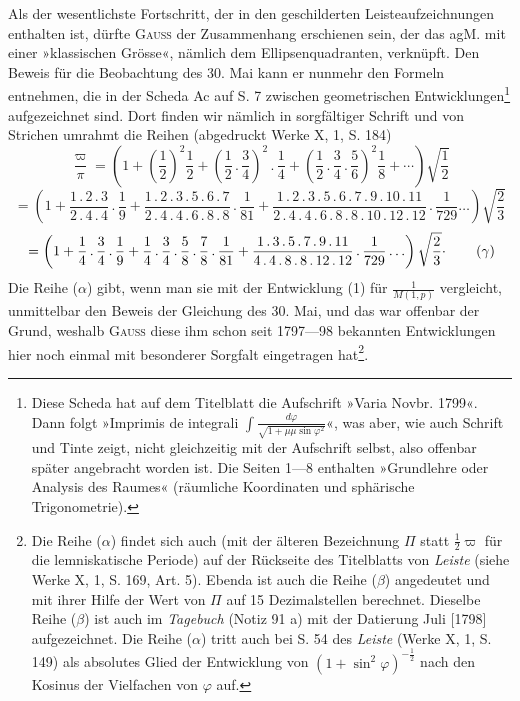 Als der wesentlichste Fortschritt, der in den geschilderten Leisteaufzeichnungen
enthalten ist, dürfte \textsc{Gauss} der Zusammenhang erschienen sein, der
das agM. mit einer »klassischen Grösse«, nämlich dem Ellipsenquadranten, verknüpft.
Den Beweis für die Beobachtung des 30. Mai kann er nunmehr
den Formeln entnehmen, die in der Scheda Ac auf S. 7 zwischen geometrischen
Entwicklungen\footnote{Diese Scheda hat auf dem Titelblatt die Aufschrift »Varia Novbr. 1799«. Dann folgt »Imprimis de integrali \(\displaystyle\int\frac{d\varphi}{\sqrt{1+\mu\mu\sin\varphi^2}}\)«, was aber, wie auch Schrift und Tinte zeigt, nicht gleichzeitig mit der Aufschrift selbst, also offenbar später angebracht worden ist. Die Seiten 1—8 enthalten »Grundlehre oder Analysis des Raumes« (räumliche Koordinaten und sphärische Trigonometrie).} aufgezeichnet sind. Dort finden wir nämlich in
sorgfältiger Schrift und von Strichen umrahmt die Reihen (abgedruckt Werke
X, 1, S. 184)
\begingroup\small\makeatletter\tagsleft@true\let\veqno\leqno\makeatother
\begin{equation*}
\frac\varpi\pi=\left(1+\left(\frac12\right)^2\frac12+\left(\frac12\,.\,\frac34\right)^2\,.\,\frac14+\left(\frac12\,.\,\frac34\,.\,\frac56\right)^2\frac18+\cdots\right)\sqrt{\frac12}\tag*{(\(\alpha\))}
\end{equation*}
\begin{equation*}
{}=\left(1+\frac{1\,.\,2\,.\,3}{2\,.\,4\,.\,4}\,.\,\frac19+\frac{1\,.\,2\,.\,3\,.\,5\,.\,6\,.\,7}{2\,.\,4\,.\,4\,.\,6\,.\,8\,.\,8}\,.\,\frac1{81}+\frac{1\,.\,2\,.\,3\,.\,5\,.\,6\,.\,7\,.\,9\,.\,10\,.\,11}{2\,.\,4\,.\,4\,.\,6\,.\,8\,.\,8\,.\,10\,.\,12\,.\,12}\,.\,\frac1{729}\ldots\right)\sqrt{\frac23}\tag*{(\(\beta\))}
\end{equation*}
\begin{equation*}
{}=\left(1+\frac14\,.\,\frac34\,.\,\frac19+\frac14\,.\,\frac34\,.\,\frac58\,.\,\frac78\,.\,\frac1{81}+\frac{1\,.\,3\,.\,5\,.\,7\,.\,9\,.\,11}{4\,.\,4\,.\,8\,.\,8\,.\,12\,.\,12}\,.\,\frac1{729}\ldots\right)\sqrt{\frac23}\mathpunct{\vcenter{\hbox{.}}}\tag*{(\(\gamma\))}
\end{equation*}
\endgroup
\noindent Die Reihe (\(\alpha\)) gibt, wenn man sie mit der Entwicklung (1) für \(\frac1{M(1,p)}\) vergleicht,
unmittelbar den Beweis der Gleichung des 30. Mai, und das war
offenbar der Grund, weshalb \textsc{Gauss} diese ihm schon seit 1797—98 bekannten
Entwicklungen hier noch einmal mit besonderer Sorgfalt eingetragen hat\footnote{Die Reihe (\(\alpha\)) findet sich auch (mit der älteren Bezeichnung \(\Pi\) statt \(\frac12\varpi\) für die lemniskatische Periode) auf der Rückseite des Titelblatts von \textit{Leiste} (siehe Werke X, 1, S. 169, Art. 5). Ebenda ist auch die Reihe (\(\beta\)) angedeutet und mit ihrer Hilfe der Wert von \(\Pi\) auf 15 Dezimalstellen berechnet. Dieselbe Reihe (\(\beta\)) ist auch im \textit{Tagebuch} (Notiz 91 a) mit der Datierung Juli [1798] aufgezeichnet. Die Reihe (\(\alpha\)) tritt auch bei S. 54 des \textit{Leiste} (Werke X, 1, S. 149) als absolutes Glied der Entwicklung von \((1+\sin^2\varphi)^{-\frac12}\) nach den Kosinus der Vielfachen von \(\varphi\) auf.}.
